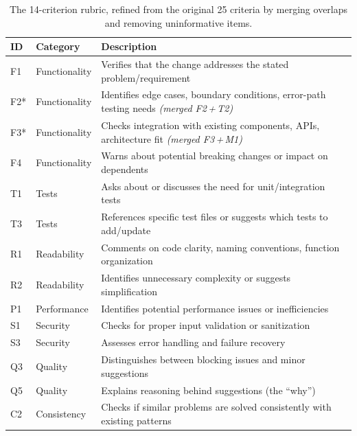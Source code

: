 

\begin{table}[t]
\centering
\caption{The 14-criterion rubric, refined from the original 25 criteria by merging overlaps and removing uninformative items.}
\label{tab:criteria14}
\begin{tabular}{llp{8cm}}
\toprule
\textbf{ID} & \textbf{Category} & \textbf{Description} \\
\midrule
F1     & Functionality & Verifies that the change addresses the stated problem/requirement \\
F2*    & Functionality & Identifies edge cases, boundary conditions, error-path testing needs \textit{(merged F2\,+\,T2)} \\
F3*    & Functionality & Checks integration with existing components, APIs, architecture fit \textit{(merged F3\,+\,M1)} \\
F4     & Functionality & Warns about potential breaking changes or impact on dependents \\
T1     & Tests         & Asks about or discusses the need for unit/integration tests \\
T3     & Tests         & References specific test files or suggests which tests to add/update \\
R1     & Readability   & Comments on code clarity, naming conventions, function organization \\
R2     & Readability   & Identifies unnecessary complexity or suggests simplification \\
P1     & Performance   & Identifies potential performance issues or inefficiencies \\
S1     & Security      & Checks for proper input validation or sanitization \\
S3     & Security      & Assesses error handling and failure recovery \\
Q3     & Quality       & Distinguishes between blocking issues and minor suggestions \\
Q5     & Quality       & Explains reasoning behind suggestions (the ``why'') \\
C2     & Consistency   & Checks if similar problems are solved consistently with existing patterns \\
\bottomrule
\end{tabular}
\end{table}


